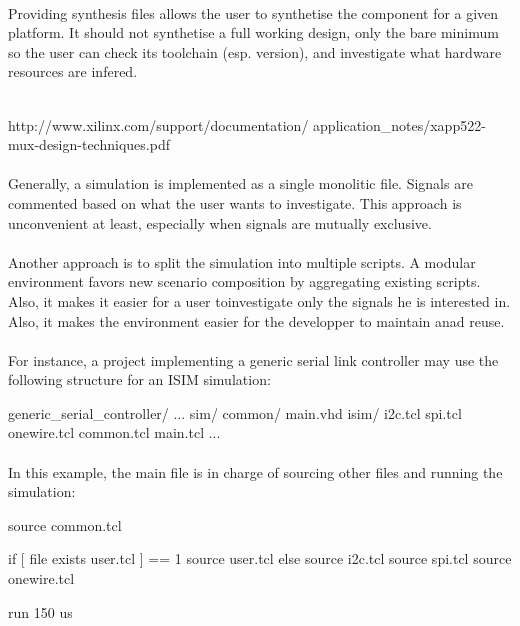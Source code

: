 \documentclass[12pt]{article}
\begin{document}
\paragraph{}
Providing synthesis files allows the user to synthetise the
component for a given platform. It should not synthetise a full
working design, only the bare minimum so the user can check its
toolchain (esp. version), and investigate what hardware resources
are infered.


\\
\longurl
{http://www.xilinx.com/support/documentation/}
{application_notes/xapp522-mux-design-techniques.pdf}


\todo{}



\paragraph{}
Generally, a simulation is implemented as a single monolitic file. Signals
are commented based on what the user wants to investigate. This approach is
unconvenient at least, especially when signals are mutually exclusive.
\paragraph{}
Another approach is to split the simulation into multiple scripts. A modular
environment favors new scenario composition by aggregating existing scripts.
Also, it makes it easier for a user toinvestigate only the signals he is
interested in. Also, it makes the environment easier for the developper to
maintain anad reuse.

\paragraph{}
For instance, a project implementing a generic serial link controller may use
the following structure for an ISIM simulation:
\begin{sh}
generic_serial_controller/
 ...
 sim/
  common/
   main.vhd
  isim/
   i2c.tcl
   spi.tcl
   onewire.tcl
   common.tcl
   main.tcl
 ...
\end{sh}

\paragraph{}
In this example, the main file is in charge of sourcing other files
and running the simulation:
\pagebreak
\begin{tcl}
source common.tcl

if { [ file exists user.tcl ] == 1 } {
 source user.tcl
} else {
 source i2c.tcl
 source spi.tcl
 source onewire.tcl
}

run 150 us
\end{tcl}
\end{document}
